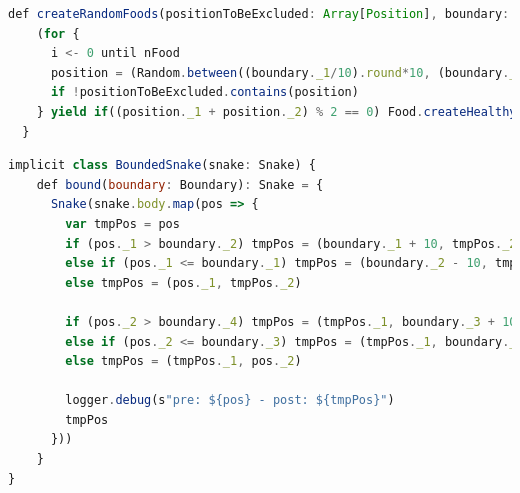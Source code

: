 \documentclass[../main.tex]{subfiles}
\begin{document}
\begin{lstlisting}[language=Javascript, caption=Generazione random delle entità "Food" tramite for-comprehension.]
def createRandomFoods(positionToBeExcluded: Array[Position], boundary: Boundary, nFood: Int): Array[Food] = {
    (for {
      i <- 0 until nFood
      position = (Random.between((boundary._1/10).round*10, (boundary._2/10).round*10), Random.between((boundary._3/10).round*10, (boundary._4/10)*10))
      if !positionToBeExcluded.contains(position)
    } yield if((position._1 + position._2) % 2 == 0) Food.createHealthyFood(position) else Food.createJunkFood(position)).toArray
  }
\end{lstlisting}

\begin{lstlisting}[language=Javascript, caption=Pimp My Library pattern - Aggiunta feature all'entità \textit{Snake} per vincolare il movimento all'interno del "mondo" di gioco.]
implicit class BoundedSnake(snake: Snake) {
    def bound(boundary: Boundary): Snake = {
      Snake(snake.body.map(pos => {
        var tmpPos = pos
        if (pos._1 > boundary._2) tmpPos = (boundary._1 + 10, tmpPos._2)
        else if (pos._1 <= boundary._1) tmpPos = (boundary._2 - 10, tmpPos._2)
        else tmpPos = (pos._1, tmpPos._2)
    
        if (pos._2 > boundary._4) tmpPos = (tmpPos._1, boundary._3 + 10)
        else if (pos._2 <= boundary._3) tmpPos = (tmpPos._1, boundary._4 - 10)
        else tmpPos = (tmpPos._1, pos._2)
    
        logger.debug(s"pre: ${pos} - post: ${tmpPos}")
        tmpPos
      }))
    }
}
\end{lstlisting}
\end{document}
